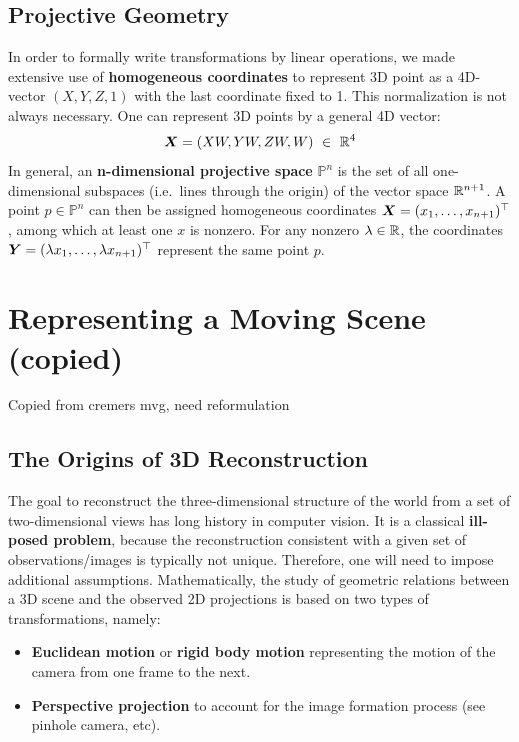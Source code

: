\subsection{Projective Geometry}%
\label{sub:projective_geometry}


In order to formally write transformations by linear operations,
we made extensive use of \textbf{homogeneous coordinates} to represent
3D point as a 4D-vector $(X,Y,Z,1)$ with the last coordinate fixed to 1.
This normalization is not always necessary. One can represent 3D points
by a general 4D vector:
\[
	\bm{X} = (XW, YW, ZW, W)\ \in\ \mathbb{R}^4
\]
In general, an \textbf{n-dimensional projective space} $\mathbb{P}^n$
is the set of all one-dimensional subspaces (i.e.\ lines through the origin)
of the vector space $\mathbb{R}^{n+1}$.
A point $p \in \mathbb{P}^n$ can then be assigned homogeneous coordinates
$\bm{X} = (x_1, \ldots, x_{n+1})^{\top}$, among which at least one $x$ is nonzero.
For any nonzero $\lambda \in \mathbb{R}$, the coordinates
$\bm{Y} = (\lambda x_1, \ldots, \lambda x_{n+1})^{\top}$
represent the same point $p$.

\section{Representing a Moving Scene (copied)}%
\label{sec:moving-scene}

\alert{Copied from cremers mvg, need reformulation}

\subsection{The Origins of 3D Reconstruction}%
\label{sub:the_origins_of_3d_reconstruction}

The goal to reconstruct the three-dimensional structure of the world from
a set of two-dimensional views has long history in computer vision.
It is a classical \textbf{ill-posed problem}, because the reconstruction
consistent with a given set of observations/images is typically not unique.
Therefore, one will need to impose additional assumptions.
Mathematically, the study of geometric relations between a 3D scene
and the observed 2D projections is based on two types of transformations, namely:
\begin{itemize}
	\item \textbf{Euclidean motion} or \textbf{rigid body motion}
		representing the motion of the camera from one frame to the next.
	\item \textbf{Perspective projection} to account for the image formation
		process (see pinhole camera, etc).
\end{itemize}

